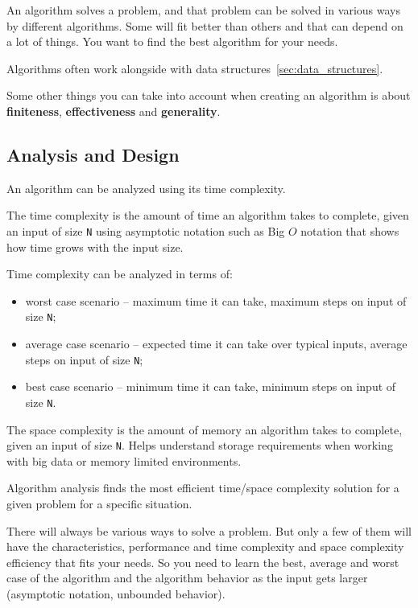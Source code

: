 \documentclass[a4paper,12pt]{article}
\theoremstyle{mytheoremstyle}
\theoremstyle{mytheoremstyle}
\theoremstyle{myproblemstyle}
\begin{document}
    An algorithm solves a problem, and that problem can be solved in various
    ways by different algorithms. Some will fit better than others and that can
    depend on a lot of things. You want to find the best algorithm for your
    needs.

    Algorithms often work alongside with {data
    structures}~\ref{sec:data_structures}.

    Some other things you can take into account when creating an algorithm is
    about \textbf{finiteness}, \textbf{effectiveness} and \textbf{generality}.

    \subsection{Analysis and Design}

    An algorithm can be analyzed using its time complexity.

    The time complexity is the amount of time an algorithm takes to complete,
    given an input of size \texttt{N} using asymptotic notation such as Big $ O
    $ notation that shows how time grows with the input size.

    Time complexity can be analyzed in terms of:
    \begin{itemize}
        \item worst case scenario -- maximum time it can take, maximum steps on input of size \texttt{N};
        \item average case scenario -- expected time it can take over typical inputs, average steps on input of size \texttt{N};
        \item best case scenario -- minimum time it can take, minimum steps on input of size \texttt{N}.
    \end{itemize}

    The space complexity is the amount of memory an algorithm takes to
    complete, given an input of size \texttt{N}. Helps understand storage
    requirements when working with big data or memory limited environments.

    Algorithm analysis finds the most efficient time/space complexity solution
    for a given problem for a specific situation.

    There will always be various ways to solve a problem. But only a few of
    them will have the characteristics, performance and time complexity and
    space complexity efficiency that fits your needs. So you need to learn the
    best, average and worst case of the algorithm and the algorithm behavior as
    the input gets larger (asymptotic notation, unbounded behavior).
\end{document}
